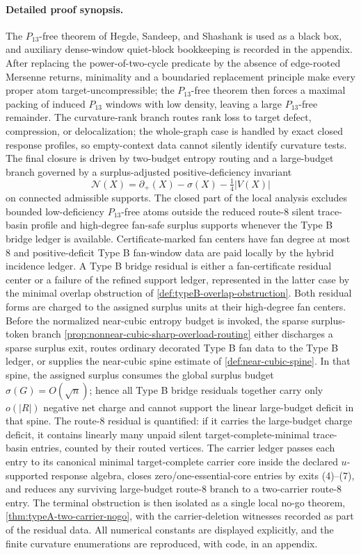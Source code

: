 \documentclass[11pt]{article}
\begin{document}
\paragraph{Detailed proof synopsis.}
The $P_{13}$-free theorem of Hegde, Sandeep, and Shashank is used as a black
box, and auxiliary dense-window quiet-block bookkeeping is recorded in the
appendix.  After replacing the power-of-two-cycle predicate by the absence of
edge-rooted Mersenne returns, minimality and a boundaried replacement principle
make every proper atom target-uncompressible; the $P_{13}$-free theorem then
forces a maximal packing of induced $P_{13}$ windows with low density, leaving
a large $P_{13}$-free remainder.  The curvature-rank branch routes rank loss to
target defect, compression, or delocalization; the whole-graph case is handled
by exact closed response profiles, so empty-context data cannot silently
identify curvature tests.  The final closure is driven by two-budget entropy
routing and a large-budget branch governed by a surplus-adjusted
positive-deficiency invariant
\[
\mathcal N(X)=\partial_+(X)-\sigma(X)-\tfrac14|V(X)|
\]
on connected admissible supports.  The closed part of the local analysis
excludes bounded low-deficiency $P_{13}$-free atoms outside the reduced route-8
silent trace-basin profile and high-degree fan-safe surplus supports whenever
the Type B bridge ledger is available.  Certificate-marked fan centers have fan
degree at most $8$ and positive-deficit Type B fan-window data are paid locally
by the hybrid incidence ledger.  A Type B bridge residual is either a
fan-certificate residual center or a failure of the refined support ledger,
represented in the latter case by the minimal overlap obstruction of
\cref{def:typeB-overlap-obstruction}.  Both residual forms are charged to the
assigned surplus units at their high-degree fan centers.  Before the normalized
near-cubic entropy budget is invoked, the sparse surplus-token branch
\cref{prop:nonnear-cubic-sharp-overload-routing} either discharges a sparse
surplus exit, routes ordinary decorated Type B fan data to the Type B ledger, or
supplies the near-cubic spine estimate of \cref{def:near-cubic-spine}.  In that
spine, the assigned surplus consumes the global surplus budget
$\sigma(G)=O(\sqrt n)$; hence all Type B bridge residuals together carry only
$o(|R|)$ negative net charge and cannot support the linear large-budget deficit
in that spine.  The route-8 residual is quantified: if it carries the
large-budget charge deficit, it contains linearly many unpaid silent
target-complete-minimal trace-basin entries, counted by their routed vertices.
The carrier ledger passes each entry to its canonical minimal
target-complete carrier core inside the declared $u$-supported response
algebra, closes zero/one-essential-core entries by exits (4)--(7), and reduces
any surviving large-budget route-8 branch to a two-carrier route-8 entry.  The
terminal obstruction is then isolated as a single local no-go theorem,
\cref{thm:typeA-two-carrier-nogo}, with the carrier-deletion witnesses recorded
as part of the residual data.  All numerical constants are displayed
explicitly, and the finite curvature enumerations are reproduced, with code, in
an appendix.
\end{document}
